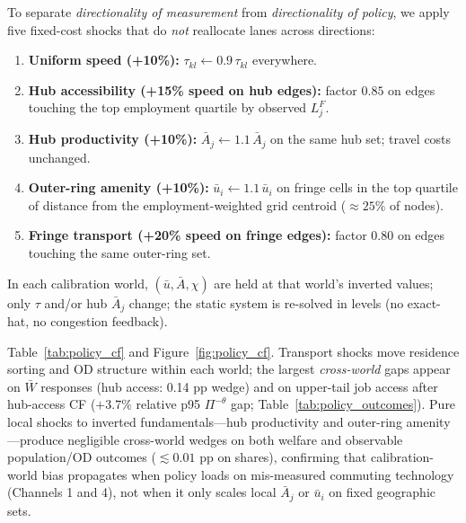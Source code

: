 \documentclass[12pt]{article}
\newcommand{\Wbar}{\bar W}
\begin{document}
To separate \emph{directionality of measurement} from \emph{directionality of policy},
we apply five fixed-cost shocks that do \emph{not} reallocate lanes across directions:
\begin{enumerate}[leftmargin=2em,itemsep=0.2em]
  \item \textbf{Uniform speed (+10\%):} $\tau_{kl}\leftarrow 0.9\,\tau_{kl}$ everywhere.
  \item \textbf{Hub accessibility (+15\% speed on hub edges):} factor $0.85$ on edges
        touching the top employment quartile by observed $L_j^F$.
  \item \textbf{Hub productivity (+10\%):} $\bar A_j\leftarrow 1.1\,\bar A_j$ on the same
        hub set; travel costs unchanged.
  \item \textbf{Outer-ring amenity (+10\%):} $\bar u_i\leftarrow 1.1\,\bar u_i$ on fringe
        cells in the top quartile of distance from the employment-weighted grid centroid
        ($\approx 25\%$ of nodes).
  \item \textbf{Fringe transport (+20\% speed on fringe edges):} factor $0.80$ on edges
        touching the same outer-ring set.
\end{enumerate}
In each calibration world, $(\bar u,\bar A,\chi)$ are held at that world's inverted
values; only $\tau$ and/or hub $\bar A_j$ change; the static system is re-solved in levels
(no exact-hat, no congestion feedback).

Table~\ref{tab:policy_cf} and Figure~\ref{fig:policy_cf}.
Transport shocks move residence sorting and OD structure within each world; the
largest \emph{cross-world} gaps appear on $\Wbar$ responses (hub access: 0.14 pp
wedge) and on upper-tail job access after hub-access CF ($+3.7\%$ relative p95
$\Pi^{- \theta}$ gap; Table~\ref{tab:policy_outcomes}).
Pure local shocks to inverted fundamentals---hub productivity and outer-ring
amenity---produce negligible cross-world wedges on both welfare and observable
population/OD outcomes ($\lesssim 0.01$ pp on shares), confirming that calibration-world
bias propagates when policy loads on mis-measured commuting technology (Channels 1
and 4), not when it only scales local $\bar A_j$ or $\bar u_i$ on fixed geographic sets.
\end{document}
